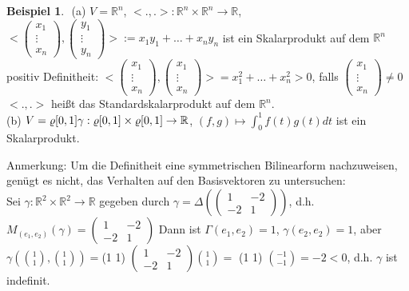 \documentclass[10pt,a4paper,numbers=endperiod]{scrartcl}
\theoremstyle{definition}
\newtheorem{bsp}[satz]{Beispiel}
\def\RR{{\mathbb R}}
\begin{document}
\begin{bsp}
	$ $
	(a) $V = \RR^n$, $<.,.>: \RR^n \times \RR^n \rightarrow \RR$, $<\begin{pmatrix}
	x_1\\
	\vdots\\
	x_n
	\end{pmatrix}, \begin{pmatrix}
	y_1\\\vdots\\
	y_n
	\end{pmatrix}> := x_1y_1+\ldots+x_ny_n$ ist ein Skalarprodukt auf dem $\RR^n$\\
	positiv Definitheit: $<\begin{pmatrix}
	x_1\\
	\vdots\\
	x_n
	\end{pmatrix}, \begin{pmatrix}
	x_1\\\vdots\\
	x_n
	\end{pmatrix}> = x_1^2+ \ldots + x_n^2 > 0$, falls $\begin{pmatrix}
	x_1\\
	\vdots\\
	x_n
	\end{pmatrix} \neq 0$\\
	$<.,.>$ heißt das Standardskalarprodukt auf dem $\RR^n$.\\
	(b) $V = \varrho [0,1]\\
	\gamma : \varrho [0,1] \times \varrho [0,1] \rightarrow \RR$, $(f,g) \mapsto \int_{0}^{1} f(t) g(t) dt$ ist ein Skalarprodukt.
\end{bsp}

Anmerkung: Um die Definitheit eine symmetrischen Bilinearform nachzuweisen, genügt es nicht, das Verhalten auf den Basisvektoren zu untersuchen:\\
Sei $\gamma: \RR^2 \times \RR^2 \rightarrow \RR$ gegeben durch $\gamma = \varDelta(\begin{pmatrix}
1 & -2\\
-2 & 1
\end{pmatrix})$, d.h. $M_{(e_1,e_2)} (\gamma) = \begin{pmatrix}
1 & -2\\
-2 & 1
\end{pmatrix}$ Dann ist $\Gamma(e_1,e_2) = 1$, $\gamma(e_2, e_2) = 1$, aber\\
$\gamma (\binom{1}{1}, \binom{1}{1}) = $(1 1) $\begin{pmatrix}
1 & -2\\
-2 & 1
\end{pmatrix} \binom{1}{1} =$ (1  1) $\binom{-1}{-1} = -2 < 0$, d.h. $\gamma$ ist indefinit. 
\end{document}
